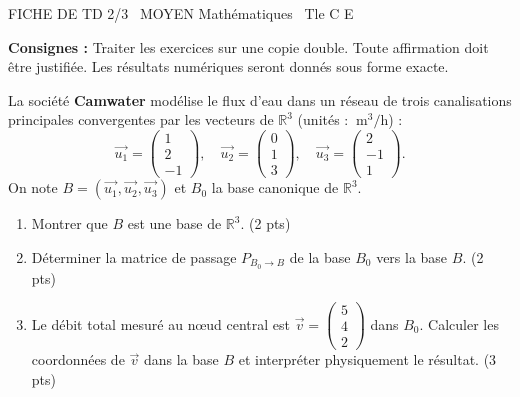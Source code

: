 \documentclass[11pt]{article}
\begin{document}
\begin{tcolorbox}[enhanced,colback=popink,colframe=popink,arc=10pt,boxrule=0pt,left=12pt,right=12pt,top=9pt,bottom=9pt]
{\color{white}\popxbold\small FICHE DE TD 2/3 \textbullet\ MOYEN \hfill Mathématiques \textbullet\ Tle C E\par}
\end{tcolorbox}
\vspace{4pt}
\noindent\textbf{Consignes :} Traiter les exercices sur une copie double. Toute affirmation doit être justifiée. Les résultats numériques seront donnés sous forme exacte.

\begin{exercice}
La société \textbf{Camwater} modélise le flux d'eau dans un réseau de trois canalisations principales convergentes par les vecteurs de $\mathbb{R}^3$ (unités : $\SI{}{\meter\cubed\per\hour}$) :
\[
\vec{u_1}=\begin{pmatrix}1\\2\\-1\end{pmatrix},\quad
\vec{u_2}=\begin{pmatrix}0\\1\\3\end{pmatrix},\quad
\vec{u_3}=\begin{pmatrix}2\\-1\\1\end{pmatrix}.
\]
On note $B=(\vec{u_1},\vec{u_2},\vec{u_3})$ et $B_0$ la base canonique de $\mathbb{R}^3$.
\begin{enumerate}
    \item Montrer que $B$ est une base de $\mathbb{R}^3$. \hfill (2 pts)
    \item Déterminer la matrice de passage $P_{B_0\to B}$ de la base $B_0$ vers la base $B$. \hfill (2 pts)
    \item Le débit total mesuré au nœud central est $\vec{v}=\begin{pmatrix}5\\4\\2\end{pmatrix}$ dans $B_0$. Calculer les coordonnées de $\vec{v}$ dans la base $B$ et interpréter physiquement le résultat. \hfill (3 pts)
\end{enumerate}
\end{exercice}
\end{document}

